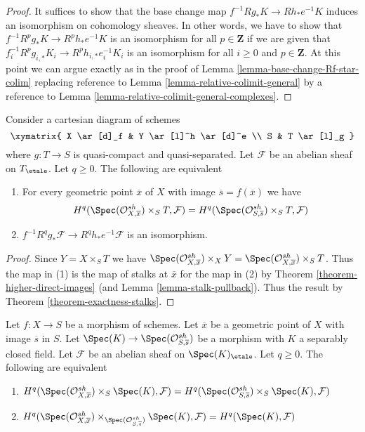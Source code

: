 \begin{proof}
It suffices to show that the base change map
$f^{-1}Rg_*K \to Rh_*e^{-1}K$ induces an isomorphism
on cohomology sheaves. In other words, we have to show
that $f^{-1}R^pg_*K \to R^ph_*e^{-1}K$ is an isomorphism
for all $p \in \mathbf{Z}$ if we are given that
$f_i^{-1}R^pg_{i, *}K_i \to R^ph_{i, *}e_i^{-1}K_i$
is an isomorphism for all $i \geq 0$ and $p \in \mathbf{Z}$.
At this point we can argue exactly as in the proof of
Lemma \ref{lemma-base-change-Rf-star-colim}
replacing reference to
Lemma \ref{lemma-relative-colimit-general}
by a reference to
Lemma \ref{lemma-relative-colimit-general-complexes}.
\end{proof}

\begin{lemma}
\label{lemma-base-change-f-star-general-stalks}
Consider a cartesian diagram of schemes
$$
\xymatrix{
X \ar[d]_f & Y \ar[l]^h \ar[d]^e \\
S & T \ar[l]_g
}
$$
where $g : T \to S$ is quasi-compact and quasi-separated.
Let $\mathcal{F}$ be an
abelian sheaf on $T_\etale$. Let $q \geq 0$. The following are equivalent
\begin{enumerate}
\item For every geometric point $\overline{x}$ of $X$ with image
$\overline{s} = f(\overline{x})$ we have
$$
H^q(\Spec(\mathcal{O}^{sh}_{X, \overline{x}}) \times_S T, \mathcal{F})
=
H^q(\Spec(\mathcal{O}^{sh}_{S, \overline{s}}) \times_S T, \mathcal{F})
$$
\item $f^{-1}R^qg_*\mathcal{F} \to R^qh_*e^{-1}\mathcal{F}$
is an isomorphism.
\end{enumerate}
\end{lemma}

\begin{proof}
Since $Y = X \times_S T$ we have
$\Spec(\mathcal{O}^{sh}_{X, \overline{x}}) \times_X Y =
\Spec(\mathcal{O}^{sh}_{X, \overline{x}}) \times_S T$. Thus
the map in (1) is the map of stalks at $\overline{x}$ for the map
in (2) by Theorem \ref{theorem-higher-direct-images} (and
Lemma \ref{lemma-stalk-pullback}).
Thus the result by Theorem \ref{theorem-exactness-stalks}.
\end{proof}

\begin{lemma}
\label{lemma-check-stalks-better}
Let $f : X \to S$ be a morphism of schemes.
Let $\overline{x}$ be a geometric point of $X$ with image $\overline{s}$ in $S$.
Let $\Spec(K) \to \Spec(\mathcal{O}^{sh}_{S, \overline{s}})$
be a morphism with $K$ a separably closed field. Let $\mathcal{F}$ be an
abelian sheaf on $\Spec(K)_\etale$. Let $q \geq 0$. The following are
equivalent
\begin{enumerate}
\item
$H^q(\Spec(\mathcal{O}^{sh}_{X, \overline{x}}) \times_S \Spec(K), \mathcal{F}) =
H^q(\Spec(\mathcal{O}^{sh}_{S, \overline{s}}) \times_S \Spec(K), \mathcal{F})$
\item
$H^q(\Spec(\mathcal{O}^{sh}_{X, \overline{x}})
\times_{\Spec(\mathcal{O}^{sh}_{S, \overline{s}})} \Spec(K), \mathcal{F}) =
H^q(\Spec(K), \mathcal{F})$
\end{enumerate}
\end{lemma}


